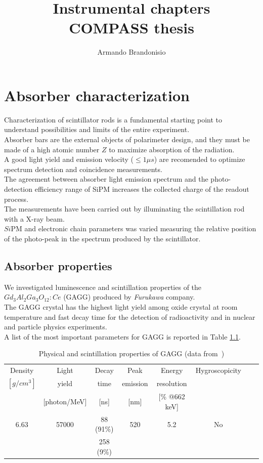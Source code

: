 \documentclass[10pt,a4paper, openany]{book}
\author{Armando Brandonisio}
\title{\textbf{Instrumental chapters}\\COMPASS thesis}
\begin{document}
\maketitle
\tableofcontents \newpage


\chapter{Absorber characterization}

Characterization of scintillator rods is a fundamental starting point to understand possibilities and limits of the entire experiment.\\
Absorber bars are the external objects of polarimeter design, and they must be made of a high atomic number $Z$ to maximize absorption of the radiation.\\
A good light yield and emission velocity ($\leq 1\mu s$) are recomended to optimize spectrum detection and coincidence measurements.\\
The agreement between absorber light emission spectrum and the photo-detection efficiency range of SiPM increases the collected charge of the readout process.\\
The measurements have been carried out by illuminating the scintillation rod with a X-ray beam.\\
$Si$PM and electronic chain parameters was varied measuring the relative position of the photo-peak in the spectrum produced by the scintillator.


\section{Absorber properties}
We investigated luminescence and scintillation properties of the $Gd_3 Al_2 Ga_3 O_{12} : Ce$ (GAGG) produced by \emph{Furukawa} company.\\
The GAGG crystal has the highest light yield among oxide crystal at room temperature \cite{abs:1} and fast decay time for the detection of radioactivity and in nuclear and particle physics experiments.\\
A list of the most important parameters for GAGG is reported in Table \ref{tab:abs1}.

\begin{table}[h]
\begin{tabular}{cccccccc}
\toprule
Density & Light & Decay & Peak & Energy & Hygroscopicity  \\
 $[g/cm^3]$ & yield & time & emission & resolution &   \\
   & [photon/MeV] & [ns] & [nm] & [\% @662 keV] &   \\
\midrule
6.63 & 57000 & 88 (91\%) & 520 & 5.2  & No\\
 & & 258 (9\%) & & & \\
\bottomrule
\end{tabular}
\caption{Physical and scintillation properties of GAGG (data from~\cite{gagg:1})} \label{tab:abs1}
\end{table}
\end{document}
